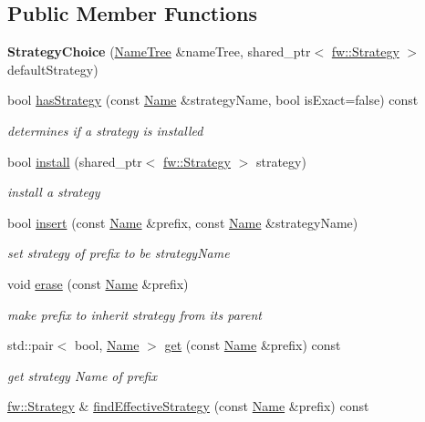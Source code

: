\subsection*{Public Member Functions}
\begin{DoxyCompactItemize}
\item 
{\bfseries Strategy\+Choice} (\hyperlink{classnfd_1_1NameTree}{Name\+Tree} \&name\+Tree, shared\+\_\+ptr$<$ \hyperlink{classnfd_1_1fw_1_1Strategy}{fw\+::\+Strategy} $>$ default\+Strategy)\hypertarget{classnfd_1_1StrategyChoice_a64866e85186d1863149877e0869f7c9c}{}\label{classnfd_1_1StrategyChoice_a64866e85186d1863149877e0869f7c9c}

\item 
bool \hyperlink{classnfd_1_1StrategyChoice_aeee6e98647f36c3de2ecb6f7cfb81fd8}{has\+Strategy} (const \hyperlink{classndn_1_1Name}{Name} \&strategy\+Name, bool is\+Exact=false) const
\begin{DoxyCompactList}\small\item\em determines if a strategy is installed \end{DoxyCompactList}\item 
bool \hyperlink{classnfd_1_1StrategyChoice_a0f48ae943375d2568b64b09491748295}{install} (shared\+\_\+ptr$<$ \hyperlink{classnfd_1_1fw_1_1Strategy}{fw\+::\+Strategy} $>$ strategy)
\begin{DoxyCompactList}\small\item\em install a strategy \end{DoxyCompactList}\item 
bool \hyperlink{classnfd_1_1StrategyChoice_acd2dd486a6e66d999228c1193da71b4c}{insert} (const \hyperlink{classndn_1_1Name}{Name} \&prefix, const \hyperlink{classndn_1_1Name}{Name} \&strategy\+Name)
\begin{DoxyCompactList}\small\item\em set strategy of prefix to be strategy\+Name \end{DoxyCompactList}\item 
void \hyperlink{classnfd_1_1StrategyChoice_a8ddc40baa29ce7600654d6a5fd8913a2}{erase} (const \hyperlink{classndn_1_1Name}{Name} \&prefix)
\begin{DoxyCompactList}\small\item\em make prefix to inherit strategy from its parent \end{DoxyCompactList}\item 
std\+::pair$<$ bool, \hyperlink{classndn_1_1Name}{Name} $>$ \hyperlink{classnfd_1_1StrategyChoice_ad0df2c880ae9fe84f3b49875a66bdbc2}{get} (const \hyperlink{classndn_1_1Name}{Name} \&prefix) const
\begin{DoxyCompactList}\small\item\em get strategy Name of prefix \end{DoxyCompactList}\item 
\hyperlink{classnfd_1_1fw_1_1Strategy}{fw\+::\+Strategy} \& \hyperlink{classnfd_1_1StrategyChoice_a045d7394111dc778e4d97fbc89082ce5}{find\+Effective\+Strategy} (const \hyperlink{classndn_1_1Name}{Name} \&prefix) const\hypertarget{classnfd_1_1StrategyChoice_a045d7394111dc778e4d97fbc89082ce5}{}\label{classnfd_1_1StrategyChoice_a045d7394111dc778e4d97fbc89082ce5}


\end{DoxyCompactItemize}

